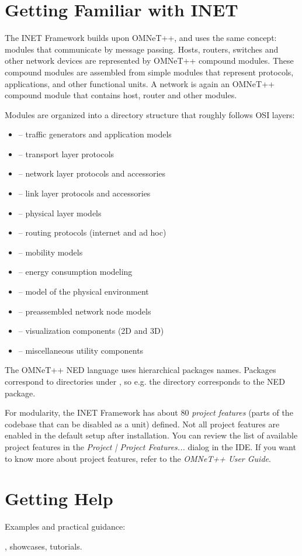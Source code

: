 \section{Getting Familiar with INET}

The INET Framework builds upon OMNeT++, and uses the same concept: modules
that communicate by message passing. Hosts, routers, switches and other
network devices are represented by OMNeT++ compound modules. These compound
modules are assembled from simple modules that represent protocols,
applications, and other functional units. A network is again an OMNeT++
compound module that contains host, router and other modules.

Modules are organized into a directory structure that roughly follows 
OSI layers:

\begin{itemize}
  \item {} -- traffic generators and application models
  \item {} -- transport layer protocols
  \item {} -- network layer protocols and accessories
  \item {} -- link layer protocols and accessories
  \item {} -- physical layer models
  \item {} -- routing protocols (internet and ad hoc)
  \item {} -- mobility models
  \item {} -- energy consumption modeling
  \item {} -- model of the physical environment
  \item {} -- preassembled network node models
  \item {} -- visualization components (2D and 3D)
  \item {} -- miscellaneous utility components
\end{itemize}

The OMNeT++ NED language uses hierarchical packages names. Packages correspond 
to directories under , so e.g. the 
directory corresponds to the  NED package.

For modularity, the INET Framework has about 80 \textit{project features}
(parts of the codebase that can be disabled as a unit) defined. Not all project
features are enabled in the default setup after installation. You can review
the list of available project features in the \emph{Project | Project Features...} 
dialog in the IDE. If you want to know more about project features, refer to the
\emph{OMNeT++ User Guide}.

\section{Getting Help}

Examples and practical guidance:

 , 
 showcases, 
 tutorials.





